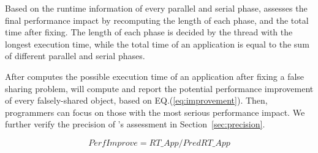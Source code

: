 Based on the runtime information of every parallel and serial phase, \cheetah{} assesses the final performance impact by recomputing the length of each phase, and the total time after fixing. The length of each phase is decided by the thread with the longest execution time, while the total time of an application is equal to the sum of different parallel and serial phases. 

After \cheetah{} computes the possible execution time of an application after fixing a false sharing problem, \cheetah{} will compute and report the potential performance improvement of every falsely-shared object, based on EQ.(\ref{eq:improvement}). Then, programmers can focus on those with the most serious performance impact. We further verify the precision of \cheetah{}'s assessment in Section~\ref{sec:precision}.

\begin{equation}
\label{eq:improvement}
PerfImprove = RT\_{App} / PredRT\_{App}
\end{equation}










